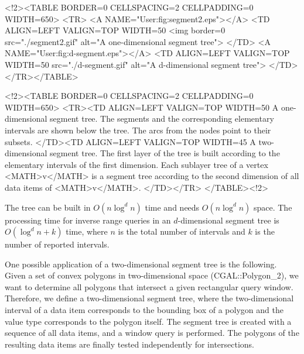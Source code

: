 \begin{ccHtmlOnly}
    <!2><TABLE BORDER=0 CELLSPACING=2 CELLPADDING=0 WIDTH=650>
        <TR>
    <A NAME="User:fig:segment2.eps"></A>
    <TD ALIGN=LEFT VALIGN=TOP WIDTH=50%
    <img border=0 src="./segment2.gif" alt="A one-dimensional segment
tree">
    </TD>
    <A NAME="User:fig:d-segment.eps"></A>
    <TD ALIGN=LEFT VALIGN=TOP WIDTH=50%
src="./d-segment.gif" alt="A d-dimensional segment tree">
      </TD></TR></TABLE>

        <!2><TABLE BORDER=0 CELLSPACING=2 CELLPADDING=0 WIDTH=650>
        <TR><TD ALIGN=LEFT VALIGN=TOP WIDTH=50%
A one-dimensional segment
  tree. The segments and the corresponding elementary intervals
  are shown below the tree. The arcs from the nodes point to
  their subsets.
 </TD><TD ALIGN=LEFT VALIGN=TOP WIDTH=45%
A two-dimensional segment
  tree. The first layer of the tree is built according to the
  elementary intervals of the first dimension. Each
  sublayer tree of a vertex  <MATH>v</MATH> is a segment tree according to
  the  second dimension of all data items of  <MATH>v</MATH>.
 </TD></TR>
        </TABLE><!2>
\end{ccHtmlOnly}

The tree can be built in  $O(n\log^{d} n)$ time and
needs  $O(n\log^{d} n)$ space.
The  processing time for inverse range
queries in an $d$-dimensional segment tree is $O(\log^d n
+k)$ time, where $n$ is the total number of intervals and $k$ is
the number of reported intervals.

One possible application of a two-dimensional segment tree is the
following. Given a set of convex polygons in two-dimensional
space (CGAL::Polygon\_2), we want to determine all polygons
that intersect a given rectangular query window. Therefore, we define a
two-dimensional segment tree, where the two-dimensional interval of
a data item corresponds to the  bounding box of a polygon and the
value type corresponds to the polygon itself. The segment tree is created
with a sequence of all data items, and a window query is
performed. The polygons of the resulting data items are finally
tested independently for intersections.

